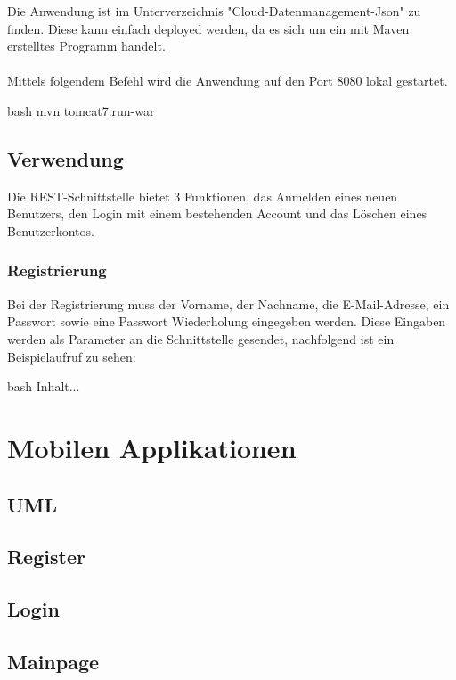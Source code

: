 Die Anwendung ist im Unterverzeichnis "Cloud-Datenmanagement-Json" zu finden. Diese kann einfach deployed werden, da es sich um ein mit Maven erstelltes Programm handelt.
\\\\
Mittels folgendem Befehl wird die Anwendung auf den Port 8080 lokal gestartet.

\begin{code}{bash}
	mvn tomcat7:run-war
\end{code}

\subsection{Verwendung}

Die REST-Schnittstelle bietet 3 Funktionen, das Anmelden eines neuen Benutzers, den Login mit einem bestehenden Account und das Löschen eines Benutzerkontos.

\subsubsection{Registrierung}

Bei der Registrierung muss der Vorname, der Nachname, die E-Mail-Adresse, ein Passwort sowie eine Passwort Wiederholung eingegeben werden. Diese Eingaben werden als Parameter an die Schnittstelle gesendet, nachfolgend ist ein Beispielaufruf zu sehen:

\begin{code}{bash}
	Inhalt...
\end{code}

\section{Mobilen Applikationen}

\subsection{UML}

\subsection{Register}

\subsection{Login}

\subsection{Mainpage}

